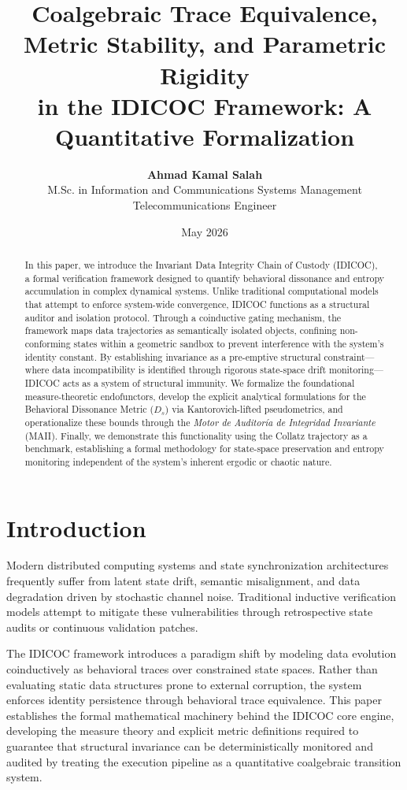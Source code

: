 \documentclass[11pt,a4paper]{article}
\title{\textbf{Coalgebraic Trace Equivalence, Metric Stability, and Parametric Rigidity\\ 
in the IDICOC Framework: A Quantitative Formalization}}
\author{\textbf{Ahmad Kamal Salah} \\ 
\small M.Sc. in Information and Communications Systems Management \\
\small Telecommunications Engineer}
\date{May 2026}
\begin{document}
\maketitle

\begin{abstract}
In this paper, we introduce the Invariant Data Integrity Chain of Custody (IDICOC), a formal verification framework designed to quantify behavioral dissonance and entropy accumulation in complex dynamical systems. Unlike traditional computational models that attempt to enforce system-wide convergence, IDICOC functions as a structural auditor and isolation protocol. Through a coinductive gating mechanism, the framework maps data trajectories as semantically isolated objects, confining non-conforming states within a geometric sandbox to prevent interference with the system's identity constant. By establishing invariance as a pre-emptive structural constraint—where data incompatibility is identified through rigorous state-space drift monitoring—IDICOC acts as a system of structural immunity. We formalize the foundational measure-theoretic endofunctors, develop the explicit analytical formulations for the Behavioral Dissonance Metric ($D_s$) via Kantorovich-lifted pseudometrics, and operationalize these bounds through the \textit{Motor de Auditoría de Integridad Invariante} (MAII). Finally, we demonstrate this functionality using the Collatz trajectory as a benchmark, establishing a formal methodology for state-space preservation and entropy monitoring independent of the system's inherent ergodic or chaotic nature.
\end{abstract}

\section{Introduction}
Modern distributed computing systems and state synchronization architectures frequently suffer from latent state drift, semantic misalignment, and data degradation driven by stochastic channel noise. Traditional inductive verification models attempt to mitigate these vulnerabilities through retrospective state audits or continuous validation patches.

The IDICOC framework introduces a paradigm shift by modeling data evolution coinductively as behavioral traces over constrained state spaces. Rather than evaluating static data structures prone to external corruption, the system enforces identity persistence through behavioral trace equivalence. This paper establishes the formal mathematical machinery behind the IDICOC core engine, developing the measure theory and explicit metric definitions required to guarantee that structural invariance can be deterministically monitored and audited by treating the execution pipeline as a quantitative coalgebraic transition system.
\end{document}
